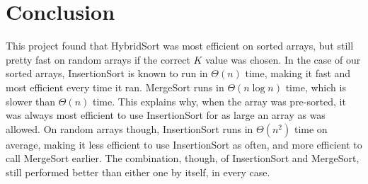 \documentclass{article}
\begin{document}
\section*{Conclusion}
This project found that HybridSort was most efficient on sorted arrays, but still pretty fast on random arrays if the correct $K$ value was chosen. In the case of our sorted arrays, InsertionSort is known to run in $\Theta(n)$ time, making it fast and most efficient every time it ran. MergeSort runs in $\Theta(n \log n)$ time, which is slower than $\Theta(n)$ time. This explains why, when the array was pre-sorted, it was always most efficient to use InsertionSort for as large an array as was allowed. On random arrays though, InsertionSort runs in $\Theta(n^2)$ time on average, making it less efficient to use InsertionSort as often, and more efficient to call MergeSort earlier. The combination, though, of InsertionSort and MergeSort, still performed better than either one by itself, in every case. 
	
\end{document}
